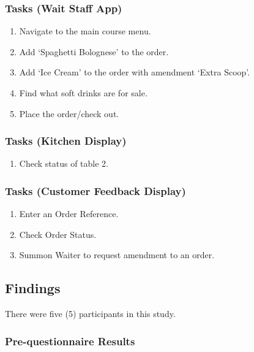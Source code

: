 \documentclass[11pt, a4paper]{report}
\begin{document}
\subsubsection{Tasks (Wait Staff App)} 
\begin{enumerate} 
\item Navigate   to   the   main   course   menu.
\item Add   ‘Spaghetti   Bolognese’   to   the   order.
\item Add   ‘Ice   Cream’   to   the   order   with   amendment   ‘Extra   Scoop’.
\item Find   what   soft   drinks   are   for   sale.
\item Place   the   order/check   out.
\end{enumerate} 
\subsubsection{Tasks (Kitchen Display)} 
\begin{enumerate} 
\item Check   status   of   table   2.
\end{enumerate} 
\subsubsection{Tasks (Customer Feedback Display)} 
\begin{enumerate} 
\item Enter an Order Reference.
\item Check Order Status.
\item Summon Waiter to request amendment to an order.
\end{enumerate} 
\subsection{Findings} 
There were five (5) participants in this study.
\subsubsection{Pre-questionnaire Results} 
\end{document}
